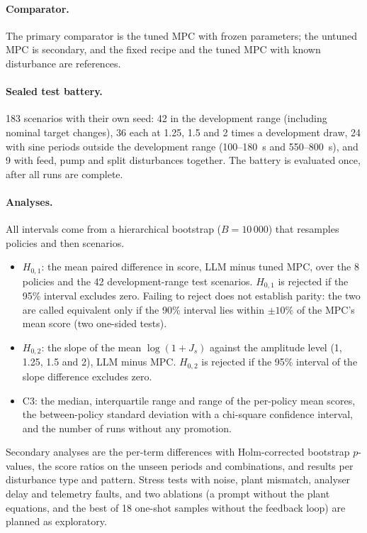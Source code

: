\paragraph{Comparator.} The primary comparator is the tuned MPC with frozen
parameters; the untuned MPC is secondary, and the fixed recipe and the tuned
MPC with known disturbance are references.

\paragraph{Sealed test battery.} 183 scenarios with their own seed: 42 in the
development range (including nominal target changes), 36 each at 1.25, 1.5
and 2 times a development draw, 24 with sine periods outside the development
range (100--180~s and 550--800~s), and 9 with feed, pump and split
disturbances together. The battery is evaluated once, after all runs are
complete.

\paragraph{Analyses.} All intervals come from a hierarchical bootstrap
($B = 10\,000$) that resamples policies and then scenarios.
\begin{itemize}
\item $H_{0,1}$: the mean paired difference in score, LLM minus tuned MPC,
  over the 8 policies and the 42 development-range test scenarios. $H_{0,1}$
  is rejected if the 95\% interval excludes zero. Failing to reject does not
  establish parity: the two are called equivalent only if the 90\% interval
  lies within $\pm 10\%$ of the MPC's mean score (two one-sided tests).
\item $H_{0,2}$: the slope of the mean $\log(1 + J_s)$ against the amplitude
  level (1, 1.25, 1.5 and 2), LLM minus MPC. $H_{0,2}$ is rejected if the
  95\% interval of the slope difference excludes zero.
\item C3: the median, interquartile range and range of the per-policy mean
  scores, the between-policy standard deviation with a chi-square
  confidence interval, and the number of runs without any promotion.
\end{itemize}
Secondary analyses are the per-term differences with Holm-corrected
bootstrap $p$-values, the score ratios on the unseen periods and
combinations, and results per disturbance type and pattern. Stress tests
with noise, plant mismatch, analyser delay and telemetry faults, and two
ablations (a prompt without the plant equations, and the best of 18 one-shot
samples without the feedback loop) are planned as exploratory.
